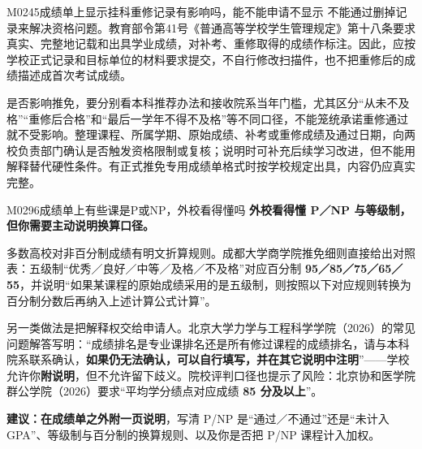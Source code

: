 \begin{qa}{M0245}{成绩单上显示挂科重修记录有影响吗，能不能申请不显示}
不能通过删掉记录来解决资格问题。教育部令第41号《普通高等学校学生管理规定》第十八条要求真实、完整地记载和出具学业成绩，对补考、重修取得的成绩作标注。因此，应按学校正式记录和目标单位的材料要求提交，不自行修改扫描件，也不把重修后的成绩描述成首次考试成绩。

是否影响推免，要分别看本科推荐办法和接收院系当年门槛，尤其区分“从未不及格”“重修后合格”和“最后一学年不得不及格”等不同口径，不能笼统承诺重修通过就不受影响。整理课程、所属学期、原始成绩、补考或重修成绩及通过日期，向两校负责部门确认是否触发资格限制或复核；说明时可补充后续学习改进，但不能用解释替代硬性条件。有正式推免专用成绩单格式时按学校规定出具，内容仍应真实完整。
\end{qa}

\begin{qa}{M0296}{成绩单上有些课是P或NP，外校看得懂吗}
\textbf{外校看得懂 P／NP 与等级制，但你需要主动说明换算口径。}

多数高校对非百分制成绩有明文折算规则。成都大学商学院推免细则直接给出对照表：五级制“优秀／良好／中等／及格／不及格”对应百分制 \textbf{95／85／75／65／55}，并说明“如果某课程的原始成绩采用的是五级制，则按照以下对应规则转换为百分制分数后再纳入上述计算公式计算”。

另一类做法是把解释权交给申请人。北京大学力学与工程科学学院（2026）的常见问题解答写明：“成绩排名是专业课排名还是所有修过课程的成绩排名，请与本科院系联系确认，\textbf{如果仍无法确认，可以自行填写，并在其它说明中注明}”——学校允许你\textbf{附说明}，但不允许留下歧义。院校评判口径也提示了风险：北京协和医学院群公学院（2026）要求“平均学分绩点对应成绩 \textbf{85 分及以上}”。

\textbf{建议：在成绩单之外附一页说明}，写清 P/NP 是“通过／不通过”还是“未计入 GPA”、等级制与百分制的换算规则、以及你是否把 P/NP 课程计入加权。
\end{qa}


